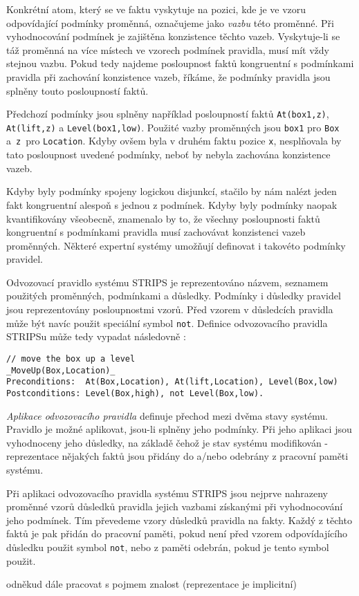 Konkrétní atom, který se ve faktu vyskytuje na pozici, kde je ve vzoru
odpovídající podmínky proměnná, označujeme jako \emph{vazbu} této proměnné. Při
vyhodnocování podmínek je zajištěna konzistence těchto vazeb. Vyskytuje-li se
táž proměnná na více místech ve vzorech podmínek pravidla, musí mít vždy stejnou
vazbu. Pokud tedy najdeme posloupnost faktů kongruentní s podmínkami pravidla
při zachování konzistence vazeb, říkáme, že podmínky pravidla jsou splněny touto
posloupností faktů.

Předchozí podmínky jsou splněny například posloupností faktů \verb|At(box1,z)|,
\verb|At(lift,z)| a \verb|Level(box1,low)|. Použité vazby proměnných jsou
\verb|box1| pro \verb|Box| a~\verb|z|~pro \verb|Location|. Kdyby ovšem byla v
druhém faktu pozice \verb|x|, nesplňovala by tato posloupnost uvedené podmínky,
neboť by nebyla zachována konzistence vazeb.

Kdyby byly podmínky spojeny logickou disjunkcí, stačilo by nám nalézt jeden
fakt kongruentní alespoň s jednou z podmínek. Kdyby byly podmínky naopak
kvantifikovány všeobecně, znamenalo by to, že všechny posloupnosti faktů
kongruentní s podmínkami pravidla musí zachovávat konzistenci vazeb proměnných.
Některé expertní systémy umožňují definovat i takovéto podmínky pravidel.

Odvozovací pravidlo systému STRIPS je reprezentováno názvem, seznamem použitých
proměnných, podmínkami a důsledky. Podmínky i důsledky pravidel jsou
reprezentovány posloupnostmi vzorů. Před vzorem v důsledcích pravidla může být
navíc použit speciální symbol \verb|not|. Definice odvozovacího pravidla STRIPSu
může tedy vypadat následovně \cite{strips}:
\begin{verbatim}
// move the box up a level
_MoveUp(Box,Location)_
Preconditions:  At(Box,Location), At(lift,Location), Level(Box,low)
Postconditions: Level(Box,high), not Level(Box,low).
\end{verbatim}

\emph{Aplikace odvozovacího pravidla} definuje přechod mezi dvěma stavy
systému. Pravidlo je možné aplikovat, jsou-li splněny jeho podmínky. Při jeho
aplikaci jsou vyhodnoceny jeho důsledky, na základě čehož je stav systému
modifikován - reprezentace nějakých faktů jsou přidány do a/nebo odebrány z
pracovní paměti systému.

Při aplikaci odvozovacího pravidla systému STRIPS jsou nejprve nahrazeny
proměnné vzorů důsledků pravidla jejich vazbami získanými při vyhodnocování
jeho podmínek. Tím převedeme vzory důsledků pravidla na fakty. Každý z těchto
faktů je pak přidán do pracovní paměti, pokud není před vzorem odpovídajícího
důsledku použit symbol \verb|not|, nebo z paměti odebrán, pokud je tento symbol
použit.

\begin{framed}
odněkud dále pracovat s pojmem znalost (reprezentace je implicitní)
\end{framed}
